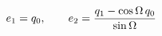\documentclass[preview]{standalone}
\begin{document}
\begin{align*}
\special{dvisvgm:raw <g id='unique000'>}e_1=q_0,\qquad e_2=\frac{q_1-\cos\Omega\,q_0}{\sin\Omega}\special{dvisvgm:raw </g>}
\end{align*}
\end{document}
